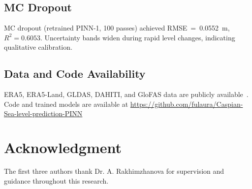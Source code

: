 \documentclass[conference,a4paper]{IEEEtran}
\begin{document}
\subsection{MC Dropout}

MC dropout (retrained PINN-1, 100 passes) achieved RMSE~=~0.0552~m, $R^2{=}0.6053$. Uncertainty bands widen during rapid level changes, indicating qualitative calibration.

\subsection{Data and Code Availability}

ERA5, ERA5-Land, GLDAS, DAHITI, and GloFAS data are publicly available~\cite{hersbach2020era5,munoz2021eraland,rodell2004gldas,schwatke2015dahiti,grimaldi2022glofas}. Code and trained models are available at \url{https://github.com/fulaura/Caspian-Sea-level-prediction-PINN}
\section*{Acknowledgment}
The first three authors thank Dr. A. Rakhimzhanova for supervision and guidance throughout this research.
\balance


\end{document}
